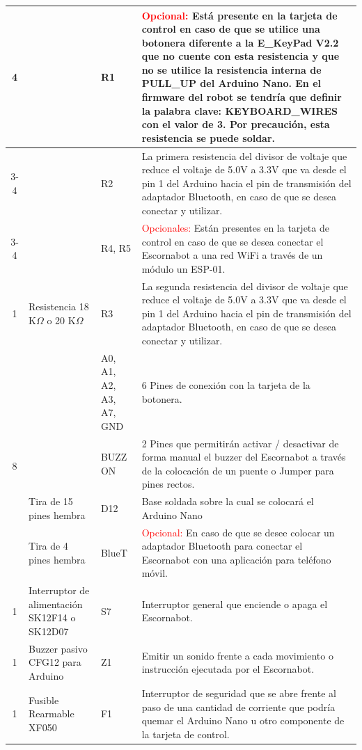 \documentclass{article}
\begin{document}
\begin{longtable}{|c|>{\raggedright}m{}|>{\centering}m{}|m{}|}
    \multirow{8}{*}{4} & \multirow{8}{0.15\textwidth}{Resistencia 10 K$\Omega$} & R1 & \textcolor{red}{Opcional:} Está presente en la tarjeta de control en caso de que se utilice una botonera diferente a la E\_KeyPad V2.2 que no cuente con esta resistencia y que no se utilice la resistencia interna de PULL\_UP del Arduino Nano. En el firmware del robot se tendría que definir la palabra clave: KEYBOARD\_WIRES con el valor de 3. Por precaución, esta resistencia se puede soldar. 
    \\ \cline{3-4}
    &  & R2 & La primera resistencia del divisor de voltaje que reduce el voltaje de 5.0V a 3.3V que va desde el pin 1 del Arduino hacia el pin de transmisión del adaptador Bluetooth, en caso de que se desea conectar y utilizar. 
    \\ \cline{3-4}
    &  & R4, R5 & \textcolor{red}{Opcionales:} Están presentes en la tarjeta de control en caso de que se desea conectar el Escornabot a una red WiFi a través de un módulo un ESP-01.  
    \\ \hline
    1 & Resistencia 18 K$\Omega$ o 20 K$\Omega$ & R3 & La segunda resistencia del divisor de voltaje que reduce el voltaje de 5.0V a 3.3V que va desde el pin 1 del Arduino hacia el pin de transmisión del adaptador Bluetooth, en caso de que se desea conectar y utilizar. 
    \\ \hline
    \multirow{4}{*}{8} & \multirow{4}{0.15\textwidth}{Pines / headers macho rectos} & A0, A1, A2, A3, A7, GND & 6 Pines de conexión con la tarjeta de la botonera. \\ \cline{3-4}
    & & BUZZ ON & 2 Pines que permitirán activar / desactivar de forma manual el buzzer del Escornabot a través de la colocación de un puente o Jumper para pines rectos.
    \\ \hline
    2 & Tira de 15 pines hembra & D12 & Base soldada sobre la cual se colocará el Arduino Nano
    \\ \hline
    1 & Tira de 4 pines hembra & BlueT & \textcolor{red}{Opcional:} En caso de que se desee colocar un adaptador Bluetooth para conectar el Escornabot con una aplicación para teléfono móvil.
    \\ \hline
    1 & Interruptor de alimentación SK12F14 o SK12D07 & S7 & Interruptor general que enciende o apaga el Escornabot.
    \\ \hline
    1 & Buzzer pasivo CFG12 para Arduino & Z1 & Emitir un sonido frente a cada movimiento o instrucción ejecutada por el Escornabot.
    \\ \hline
    1 & Fusible Rearmable XF050 & F1 & Interruptor de seguridad que se abre frente al paso de una cantidad de corriente que podría quemar el Arduino Nano u otro componente de la tarjeta de control.

\end{longtable}
\end{document}
